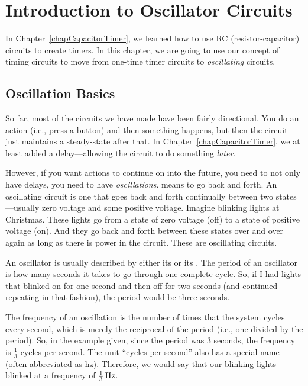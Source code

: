 \chapter{Introduction to Oscillator Circuits}
\label{chapOscillators}

In Chapter~\ref{chapCapacitorTimer}, we learned how to use RC (resistor-capacitor) circuits to create timers.  
In this chapter, we are going to use our concept of timing circuits to move from one-time timer circuits to \emph{oscillating} circuits.

\section{Oscillation Basics}

So far, most of the circuits we have made have been fairly directional.  
You do an action (i.e., press a button) and then something happens, but then the circuit just maintains a steady-state after that.
In Chapter~\ref{chapCapacitorTimer}, we at least added a delay---allowing the circuit to do something \emph{later}.

However, if you want actions to continue on into the future, you need to not only have delays, you need to have \emph{oscillations}.
 means to go back and forth.
An oscillating circuit is one that goes back and forth continually between two states---usually zero voltage and some positive voltage.
Imagine blinking lights at Christmas.
These lights go from a state of zero voltage (off) to a state of positive voltage (on). 
And they go back and forth between these states over and over again as long as there is power in the circuit.
These are oscillating circuits.

An oscillator is usually described by either its  or its .
The period of an oscillator is how many seconds it takes to go through one complete cycle.  
So, if I had lights that blinked on for one second and then off for two seconds (and continued repeating in that fashion), the period would be three seconds.

The frequency of an oscillation is the number of times that the system cycles every second, which is merely the reciprocal of the period (i.e., one divided by the period).
So, in the example given, since the period was 3 seconds, the frequency is $\frac{1}{3}$ cycles per second.
The unit ``cycles per second'' also has a special name--- (often abbreviated as hz).
Therefore, we would say that our blinking lights blinked at a frequency of $\frac{1}{3}\,\si{\hertz}$.

